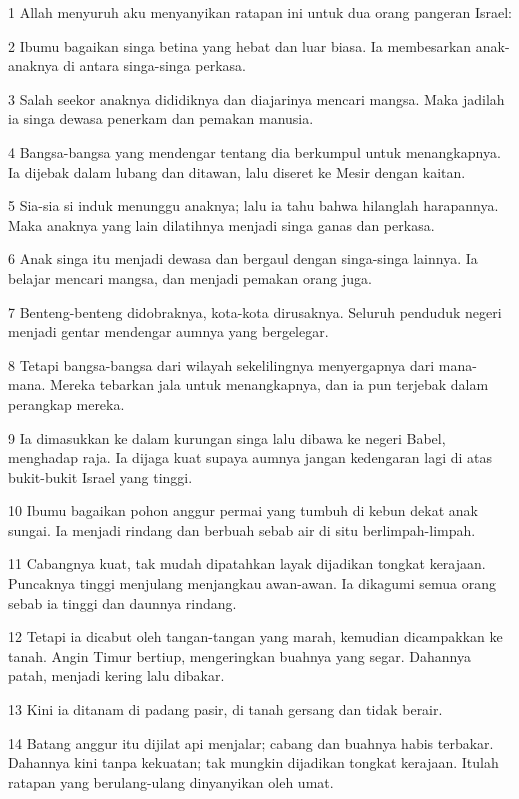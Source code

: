 \par 1 Allah menyuruh aku menyanyikan ratapan ini untuk dua orang pangeran Israel:
\par 2 Ibumu bagaikan singa betina yang hebat dan luar biasa. Ia membesarkan anak-anaknya di antara singa-singa perkasa.
\par 3 Salah seekor anaknya dididiknya dan diajarinya mencari mangsa. Maka jadilah ia singa dewasa penerkam dan pemakan manusia.
\par 4 Bangsa-bangsa yang mendengar tentang dia berkumpul untuk menangkapnya. Ia dijebak dalam lubang dan ditawan, lalu diseret ke Mesir dengan kaitan.
\par 5 Sia-sia si induk menunggu anaknya; lalu ia tahu bahwa hilanglah harapannya. Maka anaknya yang lain dilatihnya menjadi singa ganas dan perkasa.
\par 6 Anak singa itu menjadi dewasa dan bergaul dengan singa-singa lainnya. Ia belajar mencari mangsa, dan menjadi pemakan orang juga.
\par 7 Benteng-benteng didobraknya, kota-kota dirusaknya. Seluruh penduduk negeri menjadi gentar mendengar aumnya yang bergelegar.
\par 8 Tetapi bangsa-bangsa dari wilayah sekelilingnya menyergapnya dari mana-mana. Mereka tebarkan jala untuk menangkapnya, dan ia pun terjebak dalam perangkap mereka.
\par 9 Ia dimasukkan ke dalam kurungan singa lalu dibawa ke negeri Babel, menghadap raja. Ia dijaga kuat supaya aumnya jangan kedengaran lagi di atas bukit-bukit Israel yang tinggi.
\par 10 Ibumu bagaikan pohon anggur permai yang tumbuh di kebun dekat anak sungai. Ia menjadi rindang dan berbuah sebab air di situ berlimpah-limpah.
\par 11 Cabangnya kuat, tak mudah dipatahkan layak dijadikan tongkat kerajaan. Puncaknya tinggi menjulang menjangkau awan-awan. Ia dikagumi semua orang sebab ia tinggi dan daunnya rindang.
\par 12 Tetapi ia dicabut oleh tangan-tangan yang marah, kemudian dicampakkan ke tanah. Angin Timur bertiup, mengeringkan buahnya yang segar. Dahannya patah, menjadi kering lalu dibakar.
\par 13 Kini ia ditanam di padang pasir, di tanah gersang dan tidak berair.
\par 14 Batang anggur itu dijilat api menjalar; cabang dan buahnya habis terbakar. Dahannya kini tanpa kekuatan; tak mungkin dijadikan tongkat kerajaan. Itulah ratapan yang berulang-ulang dinyanyikan oleh umat.

